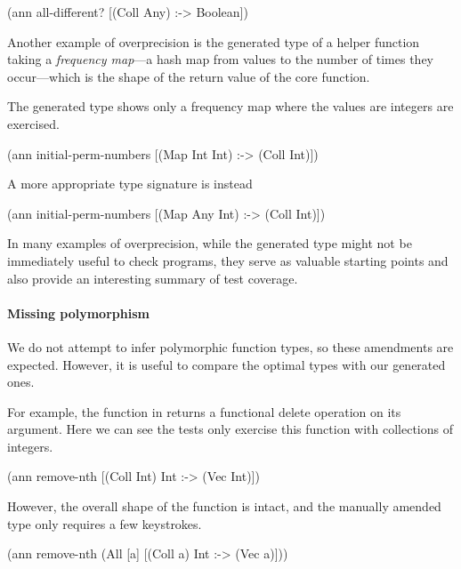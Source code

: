 \begin{cljlisting}
(ann all-different? [(Coll Any) :-> Boolean])
\end{cljlisting}

Another example of overprecision is the generated type
of  a helper function
taking a \emph{frequency map}---a hash map from values
to the number of times they occur---which is the shape
of the return value of the core 
function.

The generated type shows only a frequency map where
the values are integers are exercised.

\begin{cljlisting}
(ann initial-perm-numbers [(Map Int Int) :-> (Coll Int)])
\end{cljlisting}

A more appropriate type signature is instead

\begin{cljlisting}
(ann initial-perm-numbers [(Map Any Int) :-> (Coll Int)])
\end{cljlisting}

In many examples of overprecision, while the generated
type might not be immediately useful to check programs,
they serve as valuable starting points and also provide
an interesting summary of test coverage.

\paragraph{Missing polymorphism}

We do not attempt to infer polymorphic function types, 
so these amendments are expected. However, it is useful
to compare the optimal types with our generated ones.

For example, the  function in 
returns a functional delete operation on its argument.
Here we can see the tests only exercise this function with
collections of integers.

\begin{cljlisting}
(ann remove-nth [(Coll Int) Int :-> (Vec Int)])
\end{cljlisting}

However, the overall shape of the function is intact,
and the manually amended type only requires a few 
keystrokes.

\begin{cljlisting}
(ann remove-nth (All [a] [(Coll a) Int :-> (Vec a)]))
\end{cljlisting}

